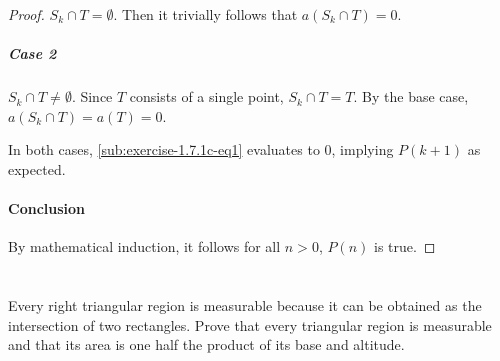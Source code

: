 \documentclass{report}
\begin{document}
\begin{proof}
      $S_k \cap T = \emptyset$.
      Then it trivially follows that $a(S_k \cap T) = 0$.

    \subparagraph{Case 2}%

      $S_k \cap T \neq \emptyset$.
      Since $T$ consists of a single point, $S_k \cap T = T$.
      By the base case, $a(S_k \cap T) = a(T) = 0$.

    \vspace{8pt}
    \noindent
    In both cases, \eqref{sub:exercise-1.7.1c-eq1} evaluates to $0$, implying
      $P(k + 1)$ as expected.

  \paragraph{Conclusion}%

    By mathematical induction, it follows for all $n > 0$, $P(n)$ is true.

\end{proof}

\section{}%
\label{sec:exercise-1.7.2}

Every right triangular region is measurable because it can be obtained as the
  intersection of two rectangles.
Prove that every triangular region is measurable and that its area is one half
  the product of its base and altitude.
\end{document}
